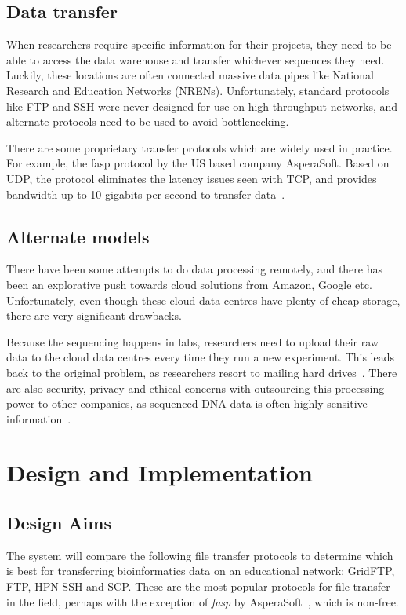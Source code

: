 \documentclass{sig-alternate-05-2015}
\begin{document}
\subsection{Data transfer}
When researchers require specific information for their projects, they need to be able to access the data warehouse and transfer whichever sequences they need. Luckily, these locations are often connected massive data pipes like National Research and Education Networks (NRENs). Unfortunately, standard protocols like FTP and SSH were never designed for use on high-throughput networks, and alternate protocols need to be used to avoid bottlenecking.

There are some proprietary transfer protocols which are widely used in practice. For example, the fasp protocol by the US based company AsperaSoft. Based on UDP, the protocol eliminates the latency issues seen with TCP, and provides bandwidth up to 10 gigabits per second to transfer data~\cite{beloslyudtsev2014aspera}.

\subsection{Alternate models}
There have been some attempts to do data processing remotely, and there has been an explorative push towards cloud solutions from Amazon, Google etc. Unfortunately, even though these cloud data centres have plenty of cheap storage, there are very significant drawbacks.

Because the sequencing happens in labs, researchers need to upload their raw data to the cloud data centres every time they run a new experiment. This leads back to the original problem, as researchers resort to mailing hard drives~\cite{baker2010next}.
There are also security, privacy and ethical concerns with outsourcing this processing power to other companies, as sequenced DNA data is often highly sensitive information~\cite{marx2013biology}.

\section{Design and Implementation}
\subsection{Design Aims} %
The system will compare the following file transfer protocols to determine which is best for transferring bioinformatics data on an educational network: GridFTP, FTP, HPN-SSH and SCP.
These are the most popular protocols for file transfer in the field, perhaps with the exception of \textit{fasp} by AsperaSoft~\cite{beloslyudtsev2014aspera}, which is non-free. 
\end{document}

